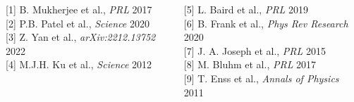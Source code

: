 \documentclass[26pt, paperwidth=36in,paperheight=48in]{tikzposter} %
\newcommand{\myfont}{\fontsize{24}{30}\selectfont}
\begin{document}
\begin{columns} 
	\block[]{\textcolor{BEC1blue}{References}}
	{
	\begin{minipage}{0.2\textwidth}
		\myfont
		{[1]} B. Mukherjee et al., \textit{PRL} 2017\\
		{[2]} P.B. Patel et al., \textit{Science} 2020\\
		{[3]} Z. Yan et al., \textit{arXiv:2212.13752} 2022\\
		{[4]} M.J.H. Ku et al., \textit{Science} 2012
	\end{minipage}
	\begin{minipage}{0.2\textwidth}
		\myfont
		{[5]} L. Baird et al., \textit{PRL} 2019\\
		{[6]} B. Frank et al.,\textit{ Phys Rev Research} 2020\\
		{[7]} J. A. Joseph et al., \textit{PRL} 2015\\
		{[8]} M. Bluhm et al., \textit{PRL} 2017\\
		{[9]} T. Enss et al., \textit{Annals of Physics} 2011
	\end{minipage}


	} 
	
	
	\block[]{\textcolor{BEC1blue}{Funding}}{

}
\end{columns}
\end{document}
